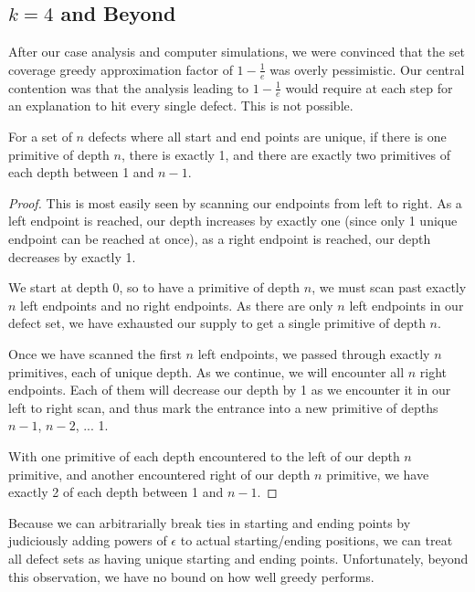 \subsection{$k=4$ and Beyond}

After our case analysis and computer simulations, we were convinced that the set coverage greedy approximation factor of $1-\frac{1}{e}$ was overly pessimistic.  Our central contention was that the analysis leading to $1-\frac{1}{e}$ would require at each step for an explanation to hit every single defect.  This is not possible.

\begin{lem} \label{lemma: Number of primitives}
For a set of $n$ defects where all start and end points are unique, if there is one primitive of depth $n$, there is exactly 1, and there are exactly two primitives of each depth between 1 and $n-1$.
\end{lem}

\begin{proof}
This is most easily seen by scanning our endpoints from left to right.  As a left endpoint is reached, our depth increases by exactly one (since only 1 unique endpoint can be reached at once), as a right endpoint is reached, our depth decreases by exactly 1.

We start at depth 0, so to have a primitive of depth $n$, we must scan past exactly $n$ left endpoints and no right endpoints.  As there are only $n$ left endpoints in our defect set, we have exhausted our supply to get a single primitive of depth $n$.

Once we have scanned the first $n$ left endpoints, we passed through exactly $n$ primitives, each of unique depth.  As we continue, we will encounter all $n$ right endpoints.  Each of them will decrease our depth by 1 as we encounter it in our left to right scan, and thus mark the entrance into a new primitive of depths $n-1$, $n-2$, ... 1.  

With one primitive of each depth encountered to the left of our depth $n$ primitive, and another encountered right of our depth $n$ primitive, we have exactly 2 of each depth between 1 and $n-1$.
\end{proof}

Because we can arbitrarially break ties in starting and ending points by judiciously adding powers of $\epsilon$ to actual starting/ending positions, we can treat all defect sets as having unique starting and ending points.  Unfortunately, beyond this observation, we have no bound on how well greedy performs.

